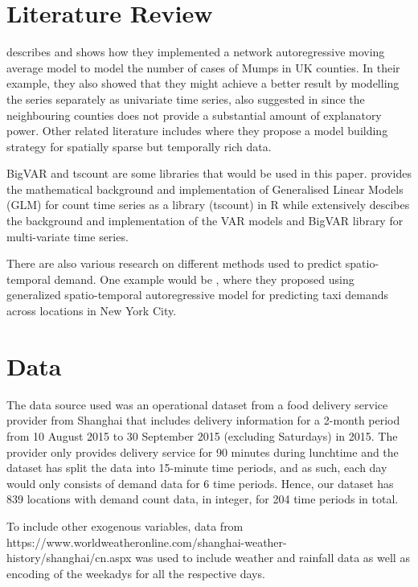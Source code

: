 \documentclass[12pt, letterpaper] {article}
\begin{document}
\section{Literature Review}
\cite{Marina2016} describes and shows how they implemented a network autoregressive moving average model to model the number of cases of Mumps in UK counties. In their example, they also showed that they might achieve a better result by modelling the series separately as univariate time series, also suggested in \cite{Nunes2015} since the neighbouring counties does not provide a substantial amount of explanatory power.  Other related literature includes \cite{Xavier2005} where they propose a model building strategy for spatially sparse but temporally rich data. 

\noindent BigVAR and tscount are some libraries that would be used in this paper. \cite{Tobias2017} provides the mathematical background and implementation of Generalised Linear Models (GLM) for count time series as a library (tscount) in R while \cite{William2017} extensively descibes the background and implementation of the VAR models and BigVAR library for multi-variate time series.

\noindent There are also various research on different methods used to predict spatio-temporal demand. One example would be \cite{Abolfazl2017}, where they proposed using generalized spatio-temporal autoregressive model for predicting taxi demands across locations in New York City. 

\section{Data}
The data source used was an operational dataset from a food delivery service provider from Shanghai that includes delivery information for a 2-month period from 10 August 2015 to 30 September 2015 (excluding Saturdays) in 2015. The provider only provides delivery service for 90 minutes during lunchtime and the dataset has split the data into 15-minute time periods, and as such, each day would only consists of demand data for 6 time periods. Hence, our dataset has 839 locations with demand count data, in integer, for 204 time periods in total. 

\noindent To include other exogenous variables, data from https://www.worldweatheronline.com/shanghai-weather-history/shanghai/cn.aspx was used to include weather and rainfall data as well as encoding of the weekadys for all the respective days. 
\end{document}
